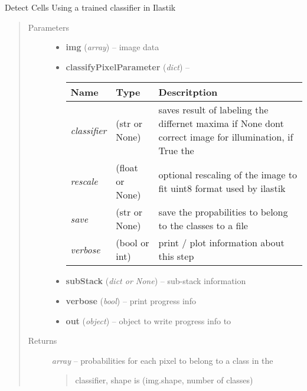\documentclass[letterpaper,10pt,english]{sphinxmanual}
\begin{document}

\begin{fulllineitems}
\label{api/ClearMap.ImageProcessing:ClearMap.ImageProcessing.IlastikClassification.classifyPixel}
Detect Cells Using a trained classifier in Ilastik
\begin{quote}\begin{description}
\item[{Parameters}] \leavevmode\begin{itemize}
\item {} 
\textbf{img} (\emph{array}) --
image data

\item {} 
\textbf{classifyPixelParameter} (\emph{dict}) --

\begin{tabulary}{\linewidth}{|L|L|L|}
\hline
\textsf{\relax 
Name
} & \textsf{\relax 
Type
} & \textsf{\relax 
Descritption
}\\
\hline
\emph{classifier}
 & 
(str or  None)
 & 
saves result of labeling the differnet maxima
if None dont correct image for illumination, if True the
\\
\hline
\emph{rescale}
 & 
(float or None)
 & 
optional rescaling of the image to fit uint8 format
used by ilastik
\\
\hline
\emph{save}
 & 
(str or None)
 & 
save the propabilities to belong to the classes to a file
\\
\hline
\emph{verbose}
 & 
(bool or int)
 & 
print / plot information about this step
\\
\hline\end{tabulary}


\item {} 
\textbf{subStack} (\emph{dict or None}) --
sub-stack information

\item {} 
\textbf{verbose} (\emph{bool}) --
print progress info

\item {} 
\textbf{out} (\emph{object}) --
object to write progress info to

\end{itemize}

\item[{Returns}] \leavevmode

\emph{array} --
probabilities for each pixel to belong to a class in the
\begin{quote}

classifier, shape is (img.shape, number of classes)
\end{quote}


\end{description}\end{quote}

\end{fulllineitems}
\end{document}
